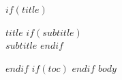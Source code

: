 \documentclass[$if(fontsize)$$fontsize$,$endif$]{article}
\begin{document}
$if(title)$
\begin{center}
{\LARGE\bfseries $title$}
$if(subtitle)$
\\[0.5em]
{\large $subtitle$}
$endif$
\\[1em]
\end{center}
$endif$
$if(toc)$
\tableofcontents
\newpage
$endif$
$body$
\end{document}
